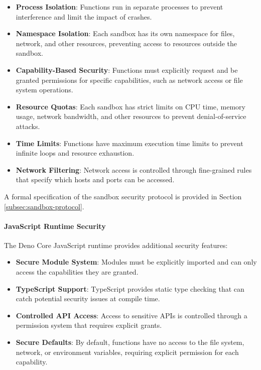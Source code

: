 \documentclass{article}
\begin{document}
\begin{itemize}
    \item \textbf{Process Isolation}: Functions run in separate processes to prevent interference and limit the impact of crashes.
    
    \item \textbf{Namespace Isolation}: Each sandbox has its own namespace for files, network, and other resources, preventing access to resources outside the sandbox.
    
    \item \textbf{Capability-Based Security}: Functions must explicitly request and be granted permissions for specific capabilities, such as network access or file system operations.
    
    \item \textbf{Resource Quotas}: Each sandbox has strict limits on CPU time, memory usage, network bandwidth, and other resources to prevent denial-of-service attacks.
    
    \item \textbf{Time Limits}: Functions have maximum execution time limits to prevent infinite loops and resource exhaustion.
    
    \item \textbf{Network Filtering}: Network access is controlled through fine-grained rules that specify which hosts and ports can be accessed.
\end{itemize}

A formal specification of the sandbox security protocol is provided in Section \ref{subsec:sandbox-protocol}.



\paragraph{JavaScript Runtime Security}
The Deno Core JavaScript runtime provides additional security features:

\begin{itemize}
    \item \textbf{Secure Module System}: Modules must be explicitly imported and can only access the capabilities they are granted.
    
    \item \textbf{TypeScript Support}: TypeScript provides static type checking that can catch potential security issues at compile time.
    
    \item \textbf{Controlled API Access}: Access to sensitive APIs is controlled through a permission system that requires explicit grants.
    
    \item \textbf{Secure Defaults}: By default, functions have no access to the file system, network, or environment variables, requiring explicit permission for each capability.
\end{itemize}
\end{document}
